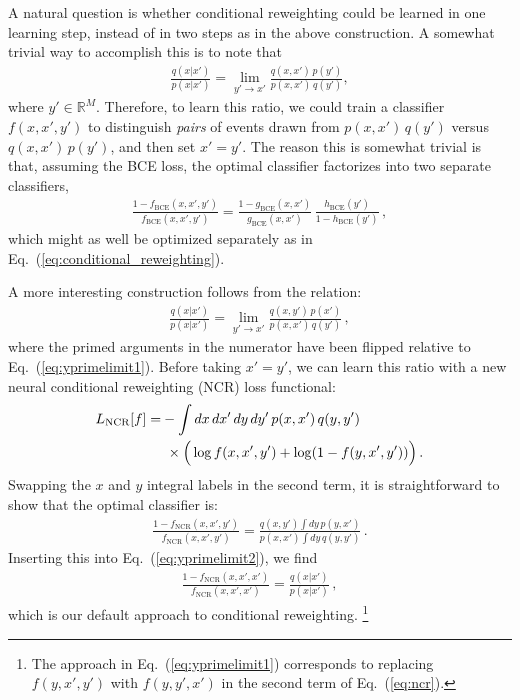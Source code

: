 \documentclass[aps,prx,reprint,preprintnumbers,superscriptaddress,nofootinbib,longbibliography,floatfix]{revtex4-2}
\DeclareRobustCommand{\Eq}[1]{Eq.~(\ref{eq:#1})}
\begin{document}
A natural question is whether conditional reweighting could be learned in one learning step, instead of in two steps as in the above construction.
%
A somewhat trivial way to accomplish this is to note that
%
\begin{align}
\label{eq:yprimelimit1}
    \frac{q(x|x')}{p(x|x')} = \lim_{y' \to x'} \frac{q(x,x')\, p(y')}{p(x,x') \, q(y')},
\end{align}
%
where $y' \in \mathbb{R}^M$.
%
Therefore, to learn this ratio, we could train a classifier $f(x,x',y')$ to distinguish \emph{pairs} of events drawn from $p(x,x') \, q(y')$ versus $q(x,x')\, p(y')$, and then set $x' = y'$.
%
The reason this is somewhat trivial is that, assuming the BCE loss, the optimal classifier factorizes into two separate classifiers,
%
\begin{align}
\label{eq:double_bce}
    \frac{1-f_\text{BCE}(x,x',y')}{f_\text{BCE}(x,x',y')}
    =
    \frac{1-g_\text{BCE}(x,x')}{g_\text{BCE}(x,x')}
    \, 
    \frac{h_\text{BCE}(y')}{1-h_\text{BCE}(y')}\,,
\end{align}
%
which might as well be optimized separately as in \Eq{conditional_reweighting}.


A more interesting construction follows from the relation:
%
\begin{align}
\label{eq:yprimelimit2}
    \frac{q(x|x')}{p(x|x')} = \lim_{y' \to x'} \frac{q(x,y')\, p(x')}{p(x,x') \, q(y')}\,,
\end{align}
%
where the primed arguments in the numerator have been flipped relative to \Eq{yprimelimit1}.
%
Before taking $x' = y'$, we can learn this ratio with a new neural conditional reweighting (NCR) loss functional: 
%
\begin{align}
\label{eq:ncr}
L_{\rm NCR}[f] = & -\int dx \,dx'\,dy\,dy'\, p(x,x') \, q(y,y')\\
& ~ \times \Big( \log f(x,x',y') + \log (1-f(y,x',y')) \Big)\,.
\nonumber   \end{align}
%
Swapping the $x$ and $y$ integral labels in the second term, it is straightforward to show that the optimal classifier is:
%
\begin{align}
\label{eq:ncr_solution}
\frac{1-f_\text{NCR}(x,x',y')}{f_\text{NCR}(x,x',y')} = \frac{q(x,y') \int dy \, p(y,x')}{p(x,x') \int dy \, q(y,y')}\,.
\end{align}
%
Inserting this into \Eq{yprimelimit2}, we find
%
\begin{align}
\label{eq:ncr_final}
\frac{1-f_\text{NCR}(x,x',x')}{f_\text{NCR}(x,x',x')} =      \frac{q(x|x')}{p(x|x')}\,,
\end{align}
%
which is our default approach to conditional reweighting.%
%
\footnote{The approach in \Eq{yprimelimit1} corresponds to replacing $f(y,x',y')$ with $f(y,y',x')$ in the second term of \Eq{ncr}.}
\end{document}
